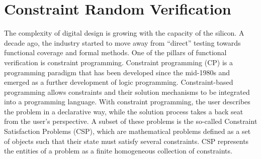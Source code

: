 \documentclass[conference]{IEEEtran}
\begin{document}
\section{Constraint Random Verification}
The complexity of digital design is growing with the capacity of the silicon. A decade ago, the industry started to move away from ``direct''
testing towards functional coverage and formal methods. One of the pillars of functional verification is constraint programming.
Constraint programming (CP) is a programming paradigm that has been developed since the mid-1980s and emerged as a further development of logic
programming. Constraint-based programming allows constraints and their solution mechanisms to be integrated into a programming language.
With constraint programming, the user describes the problem in a declarative way, while the solution process takes a back seat from the user's
perspective. A subset of these problems is the so-called Constraint Satisfaction Problems (CSP), which are mathematical problems defined as a
set of objects such that their state must satisfy several constraints. CSP represents the entities of a problem as a finite homogeneous
collection of constraints.
\end{document}
